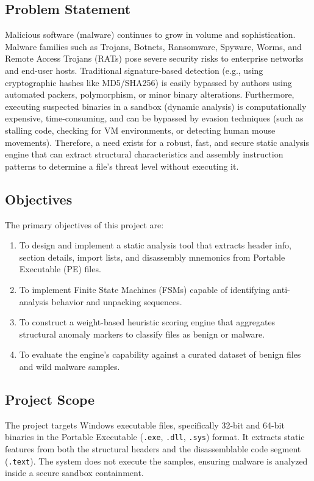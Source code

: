 \documentclass[11pt,a4paper]{article}
\begin{document}
\subsection{Problem Statement}
Malicious software (malware) continues to grow in volume and sophistication. Malware families such as Trojans, Botnets, Ransomware, Spyware, Worms, and Remote Access Trojans (RATs) pose severe security risks to enterprise networks and end-user hosts. Traditional signature-based detection (e.g., using cryptographic hashes like MD5/SHA256) is easily bypassed by authors using automated packers, polymorphism, or minor binary alterations. Furthermore, executing suspected binaries in a sandbox (dynamic analysis) is computationally expensive, time-consuming, and can be bypassed by evasion techniques (such as stalling code, checking for VM environments, or detecting human mouse movements). Therefore, a need exists for a robust, fast, and secure static analysis engine that can extract structural characteristics and assembly instruction patterns to determine a file's threat level without executing it.

\subsection{Objectives}
The primary objectives of this project are:
\begin{enumerate}
    \item To design and implement a static analysis tool that extracts header info, section details, import lists, and disassembly mnemonics from Portable Executable (PE) files.
    \item To implement Finite State Machines (FSMs) capable of identifying anti-analysis behavior and unpacking sequences.
    \item To construct a weight-based heuristic scoring engine that aggregates structural anomaly markers to classify files as benign or malware.
    \item To evaluate the engine's capability against a curated dataset of benign files and wild malware samples.
\end{enumerate}

\subsection{Project Scope}
The project targets Windows executable files, specifically 32-bit and 64-bit binaries in the Portable Executable (\texttt{.exe}, \texttt{.dll}, \texttt{.sys}) format. It extracts static features from both the structural headers and the disassemblable code segment (\texttt{.text}). The system does not execute the samples, ensuring malware is analyzed inside a secure sandbox containment.
\end{document}
